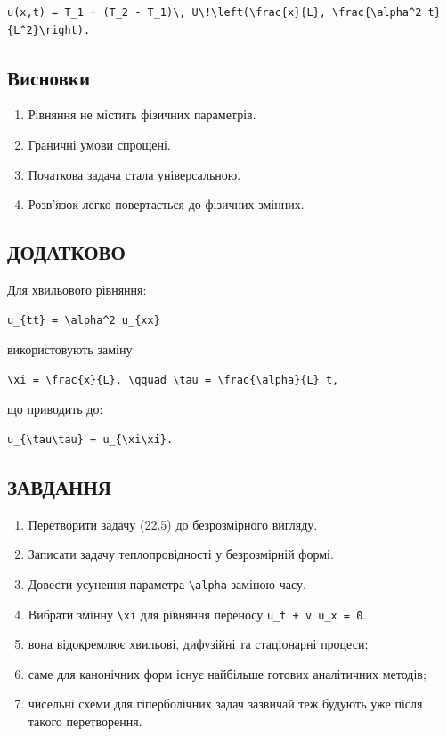 \documentclass[
  ukrainian,
]{article}
\providecommand{\tightlist}{%
  \setlength{\itemsep}{0pt}\setlength{\parskip}{0pt}}
\begin{document}
\begin{verbatim}
u(x,t) = T_1 + (T_2 - T_1)\, U\!\left(\frac{x}{L}, \frac{\alpha^2 t}{L^2}\right).
\end{verbatim}

\subsection{Висновки}\label{ux432ux438ux441ux43dux43eux432ux43aux438}

\begin{enumerate}
\def\labelenumi{\arabic{enumi}.}
\tightlist
\item
  Рівняння не містить фізичних параметрів.
\item
  Граничні умови спрощені.
\item
  Початкова задача стала універсальною.
\item
  Розв'язок легко повертається до фізичних змінних.
\end{enumerate}

\subsection{ДОДАТКОВО}\label{ux434ux43eux434ux430ux442ux43aux43eux432ux43e}

Для хвильового рівняння:

\begin{verbatim}
u_{tt} = \alpha^2 u_{xx}
\end{verbatim}

використовують заміну:

\begin{verbatim}
\xi = \frac{x}{L}, \qquad \tau = \frac{\alpha}{L} t,
\end{verbatim}

що приводить до:

\begin{verbatim}
u_{\tau\tau} = u_{\xi\xi}.
\end{verbatim}

\subsection{ЗАВДАННЯ}\label{ux437ux430ux432ux434ux430ux43dux43dux44f-5}

\begin{enumerate}
\def\labelenumi{\arabic{enumi}.}
\tightlist
\item
  Перетворити задачу (22.5) до безрозмірного вигляду.
\item
  Записати задачу теплопровідності у безрозмірній формі.
\item
  Довести усунення параметра \texttt{\textbackslash{}alpha} заміною
  часу.
\item
  Вибрати змінну \texttt{\textbackslash{}xi} для рівняння переносу
  \texttt{u\_t\ +\ v\ u\_x\ =\ 0}.
\item
  вона відокремлює хвильові, дифузійні та стаціонарні процеси;
\item
  саме для канонічних форм існує найбільше готових аналітичних методів;
\item
  чисельні схеми для гіперболічних задач зазвичай теж будують уже після
  такого перетворення.
\end{enumerate}
\end{document}
